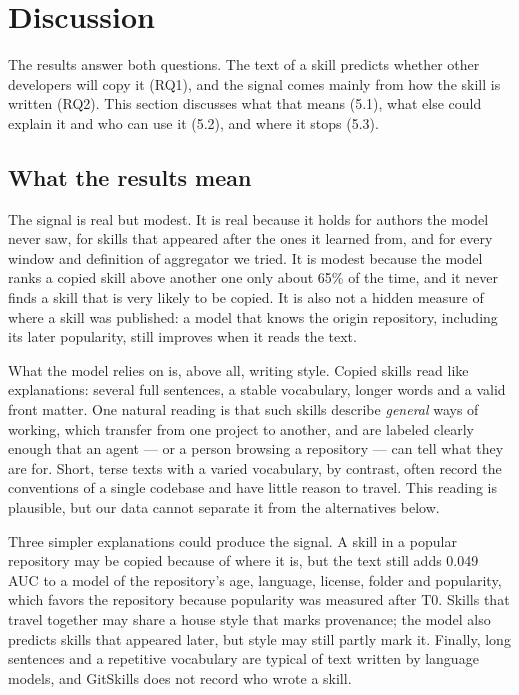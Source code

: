\section{Discussion}\label{discussion}

The results answer both questions. The text of a skill predicts whether
other developers will copy it (RQ1), and the signal comes mainly from
how the skill is written (RQ2). This section discusses what that means
(5.1), what else could explain it and who can use it (5.2), and where it
stops (5.3).

\subsection{What the results mean}\label{what-the-results-mean}

The signal is real but modest. It is real because it holds for authors
the model never saw, for skills that appeared after the ones it learned
from, and for every window and definition of aggregator we tried. It is
modest because the model ranks a copied skill above another one only
about 65\% of the time, and it never finds a skill that is very likely
to be copied. It is also not a hidden measure of where a skill was
published: a model that knows the origin repository, including its later
popularity, still improves when it reads the text.

What the model relies on is, above all, writing style. Copied skills
read like explanations: several full sentences, a stable vocabulary,
longer words and a valid front matter. One natural reading is that such
skills describe \emph{general} ways of working, which transfer from one
project to another, and are labeled clearly enough that an agent --- or
a person browsing a repository --- can tell what they are for. Short,
terse texts with a varied vocabulary, by contrast, often record the
conventions of a single codebase and have little reason to travel. This
reading is plausible, but our data cannot separate it from the
alternatives below.

Three simpler explanations could produce the signal. A skill in a
popular repository may be copied because of where it is, but the text
still adds 0.049 AUC to a model of the repository's age, language,
license, folder and popularity, which favors the repository because
popularity was measured after T0. Skills that travel together may share
a house style that marks provenance; the model also predicts skills that
appeared later, but style may still partly mark it. Finally, long
sentences and a repetitive vocabulary are typical of text written by
language models, and GitSkills does not record who wrote a skill.

